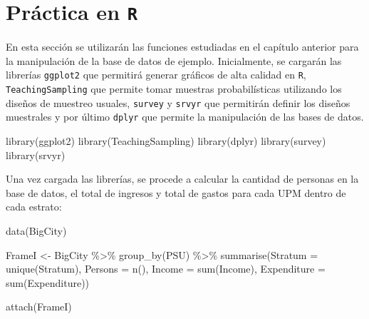 \documentclass[
  12pt,
]{book}
\newenvironment{Shaded}{\begin{snugshade}}{\end{snugshade}}
\newcommand{\AttributeTok}[1]{\textcolor[rgb]{0.77,0.63,0.00}{#1}}
\newcommand{\FunctionTok}[1]{\textcolor[rgb]{0.00,0.00,0.00}{#1}}
\newcommand{\NormalTok}[1]{#1}
\newcommand{\OtherTok}[1]{\textcolor[rgb]{0.56,0.35,0.01}{#1}}
\newcommand{\SpecialCharTok}[1]{\textcolor[rgb]{0.00,0.00,0.00}{#1}}
\newcommand{\StringTok}[1]{\textcolor[rgb]{0.31,0.60,0.02}{#1}}
\begin{document}
\hypertarget{pruxe1ctica-en-r}{%
\section{\texorpdfstring{Práctica en \texttt{R}}{Práctica en R}}\label{pruxe1ctica-en-r}}

En esta sección se utilizarán las funciones estudiadas en el capítulo anterior para la manipulación de la base de datos de ejemplo. Inicialmente, se cargarán las librerías \texttt{ggplot2} que permitirá generar gráficos de alta calidad en \texttt{R}, \texttt{TeachingSampling} que permite tomar muestras probabilísticas utilizando los diseños de muestreo usuales, \texttt{survey} y \texttt{srvyr} que permitirán definir los diseños muestrales y por último \texttt{dplyr} que permite la manipulación de las bases de datos.

\begin{Shaded}
\begin{Highlighting}[]
\FunctionTok{library}\NormalTok{(ggplot2)}
\FunctionTok{library}\NormalTok{(TeachingSampling)}
\FunctionTok{library}\NormalTok{(dplyr)}
\FunctionTok{library}\NormalTok{(survey)}
\FunctionTok{library}\NormalTok{(srvyr)}
\end{Highlighting}
\end{Shaded}

Una vez cargada las librerías, se procede a calcular la cantidad de personas en la base de datos, el total de ingresos y total de gastos para cada UPM dentro de cada estrato:

\begin{Shaded}
\begin{Highlighting}[]
\FunctionTok{data}\NormalTok{(}\StringTok{\textquotesingle{}BigCity\textquotesingle{}}\NormalTok{)}

\NormalTok{ FrameI }\OtherTok{\textless{}{-}}\NormalTok{ BigCity }\SpecialCharTok{\%\textgreater{}\%} \FunctionTok{group\_by}\NormalTok{(PSU) }\SpecialCharTok{\%\textgreater{}\%}
 \FunctionTok{summarise}\NormalTok{(}\AttributeTok{Stratum =} \FunctionTok{unique}\NormalTok{(Stratum),}
           \AttributeTok{Persons =} \FunctionTok{n}\NormalTok{(),}
           \AttributeTok{Income =} \FunctionTok{sum}\NormalTok{(Income),}
           \AttributeTok{Expenditure =} \FunctionTok{sum}\NormalTok{(Expenditure))}
             
\FunctionTok{attach}\NormalTok{(FrameI)}
\end{Highlighting}
\end{Shaded}
\end{document}
